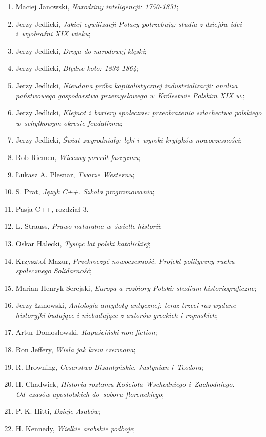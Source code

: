 \documentclass[a4paper,11pt]{article}
\begin{document}
\begin{enumerate}
\item Maciej Janowski, \emph{Narodziny inteligencji: 1750-1831};
\item Jerzy Jedlicki, \emph{Jakiej cywilizacji Polacy potrzebują:
    studia z dziejów idei i~wyobraźni XIX wieku};
\item Jerzy Jedlicki, \emph{Droga do narodowej klęski};
\item Jerzy Jedlicki, \emph{Błędne koło: 1832-1864};
\item Jerzy Jedlicki, \emph{Nieudana próba kapitalistycznej
    industrializacji: analiza państwowego gospodarstwa przemysłowego
    w~Królestwie Polskim XIX w.};
\item Jerzy Jedlicki, \emph{Klejnot i~bariery społeczne: przeobrażenia
    szlachectwa polskiego w~schyłkowym okresie feudalizmu};
\item Jerzy Jedlicki, \emph{Świat zwyrodniały: lęki i~wyroki krytyków
    nowoczesności};
\item Rob Riemen, \emph{Wieczny powrót faszyzmu};
\item Łukasz A. Plesnar, \emph{Twarze Westernu};
\item S. Prat, \emph{Język C++. Szkoła programowania};
\item Pasja C++, rozdział 3.
\item L. Strauss, \emph{Prawo naturalne w~świetle historii};
\item Oskar Halecki, \emph{Tysiąc lat polski katolickiej};
\item Krzysztof Mazur, \emph{Przekroczyć nowoczesność. Projekt
    polityczny ruchu społecznego Solidarność};
\item Marian Henryk Serejski, \emph{Europa a rozbiory Polski: studium
    historiograficzne};
\item Jerzy Łanowski, \emph{Antologia anegdoty antycznej: teraz trzeci
    raz wydane historyjki budujące i niebudujące z autorów greckich i
    rzymskich};
\item Artur Domosłowski, \emph{Kapuściński non-fiction};
\item Ron Jeffery, \emph{Wisła jak krew czerwona};
\item R. Browning, \emph{Cesarstwo Bizantyńskie}, \emph{Justynian
    i~Teodora};
\item H. Chadwick, \emph{Historia rozłamu Kościoła Wschodniego
    i~Zachodniego. Od~czasów apostolskich do~soboru florenckiego};
\item P. K. Hitti, \emph{Dzieje Arabów};
\item H. Kennedy, \emph{Wielkie arabskie podboje};

\end{enumerate}
\end{document}
